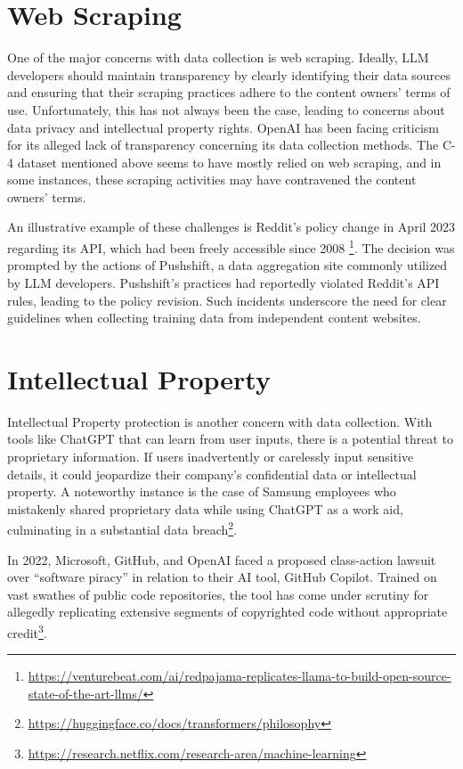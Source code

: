 \documentclass[
]{book}
\begin{document}
\hypertarget{web-scraping}{%
\section{Web Scraping}\label{web-scraping}}

One of the major concerns with data collection is web scraping. Ideally, LLM developers should maintain transparency by clearly identifying their data sources and ensuring that their scraping practices adhere to the content owners' terms of use. Unfortunately, this has not always been the case, leading to concerns about data privacy and intellectual property rights. OpenAI has been facing criticism for its alleged lack of transparency concerning its data collection methods. The C-4 dataset mentioned above seems to have mostly relied on web scraping, and in some instances, these scraping activities may have contravened the content owners' terms.

An illustrative example of these challenges is Reddit's policy change in April 2023 regarding its API, which had been freely accessible since 2008 \footnote{\url{https://venturebeat.com/ai/redpajama-replicates-llama-to-build-open-source-state-of-the-art-llms/}}. The decision was prompted by the actions of Pushshift, a data aggregation site commonly utilized by LLM developers. Pushshift's practices had reportedly violated Reddit's API rules, leading to the policy revision. Such incidents underscore the need for clear guidelines when collecting training data from independent content websites.

\hypertarget{intellectual-property}{%
\section{Intellectual Property}\label{intellectual-property}}

Intellectual Property protection is another concern with data collection. With tools like ChatGPT that can learn from user inputs, there is a potential threat to proprietary information. If users inadvertently or carelessly input sensitive details, it could jeopardize their company's confidential data or intellectual property. A noteworthy instance is the case of Samsung employees who mistakenly shared proprietary data while using ChatGPT as a work aid, culminating in a substantial data breach\footnote{\url{https://huggingface.co/docs/transformers/philosophy}}.

In 2022, Microsoft, GitHub, and OpenAI faced a proposed class-action lawsuit over ``software piracy'' in relation to their AI tool, GitHub Copilot. Trained on vast swathes of public code repositories, the tool has come under scrutiny for allegedly replicating extensive segments of copyrighted code without appropriate credit\footnote{\url{https://research.netflix.com/research-area/machine-learning}}.
\end{document}
